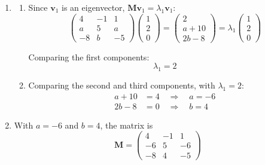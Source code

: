\documentclass[leqno]{article}
\begin{document}
\begin{enumerate}[
  label=\textbf{\arabic*.},
  leftmargin=*,
  topsep=0pt,
  partopsep=0pt,
  parsep=0pt
]
\vspace*{10pt}

\begin{djsSolution}
\begin{enumerate}[label=\textbf{(\alph*)}, start=1]
  \item
  \begin{enumerate}[label=(\roman*), start=1]
    \item Since \(\mathbf{v}_1\) is an eigenvector, \(\mathbf{M}\mathbf{v}_1=\lambda_1\mathbf{v}_1\):
\[
\begin{pmatrix} 4 & -1 & 1 \\ a & 5 & a \\ -8 & b & -5 \end{pmatrix}\begin{pmatrix} 1 \\ 2 \\ 0 \end{pmatrix}=\begin{pmatrix} 2 \\ a+10 \\ 2b-8 \end{pmatrix}=\lambda_1\begin{pmatrix} 1 \\ 2 \\ 0 \end{pmatrix}
\]

Comparing the first components:
\[
\lambda_1=2
\]

    \item Comparing the second and third components, with \(\lambda_1=2\):
\begin{align*}
a+10&=4 \quad\Longrightarrow\quad a=-6\\
2b-8&=0 \quad\Longrightarrow\quad b=4
\end{align*}

  \end{enumerate}
  \item With \(a=-6\) and \(b=4\), the matrix is
\[
\mathbf{M}=\begin{pmatrix} 4 & -1 & 1 \\ -6 & 5 & -6 \\ -8 & 4 & -5 \end{pmatrix}
\]


\end{enumerate}
\end{djsSolution}
\end{enumerate}
\end{document}
